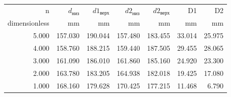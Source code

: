 \begin{table}[H]
    \centering
    \begin{tabular}{rrrrrrr}
        \toprule
        n             & $d_\text{низ}$      & $d1_\text{верх}$    & $d2_\text{низ}$     & $d2_\text{верх}$    & D1                  & D2                  \\
        dimensionless & \si[]{\milli\meter} & \si[]{\milli\meter} & \si[]{\milli\meter} & \si[]{\milli\meter} & \si[]{\milli\meter} & \si[]{\milli\meter} \\
        \midrule
        5.000         & 157.030             & 190.044             & 157.480             & 183.455             & 33.014              & 25.975              \\
        4.000         & 158.760             & 188.215             & 159.440             & 187.505             & 29.455              & 28.065              \\
        3.000         & 161.090             & 186.010             & 161.860             & 185.160             & 24.920              & 23.300              \\
        2.000         & 163.780             & 183.205             & 164.938             & 182.018             & 19.425              & 17.080              \\
        1.000         & 168.160             & 179.628             & 170.425             & 177.215             & 11.468              & 6.790               \\
        \bottomrule
    \end{tabular}
\end{table}
